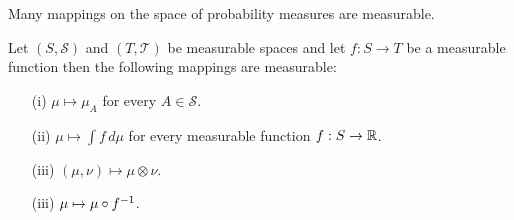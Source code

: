 Many mappings on the space of probability measures are measurable.
\begin{lem}\label{MeasurableMappingsOfMeasures}Let $(S, \mathcal{S})$ and $(T, \mathcal{T})$ be measurable
  spaces and let $f : S \to T$ be a measurable function then the following mappings are measurable:
\begin{itemize}
\item[(i)]$\mu \mapsto \mu_A$ for every $A \in \mathcal{S}$.
\item[(ii)]$\mu \mapsto \int f \, d\mu$ for every measurable function $f: S \to \mathbb{R}$.
\item[(iii)]$(\mu,\nu) \mapsto \mu \otimes \nu$.
\item[(iii)]$\mu \mapsto \mu \circ f^{-1}$.
\end{itemize}
\end{lem}
